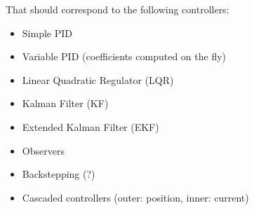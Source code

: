 That should correspond to the following controllers:

\begin{itemize}
    \item Simple PID
    \item Variable PID (coefficients computed on the fly)
    \item Linear Quadratic Regulator (LQR)
    \item Kalman Filter (KF)
    \item Extended Kalman Filter (EKF)
    \item Observers
    \item Backstepping (?)
    \item Cascaded controllers (outer: position, inner: current)
\end{itemize}


% 
